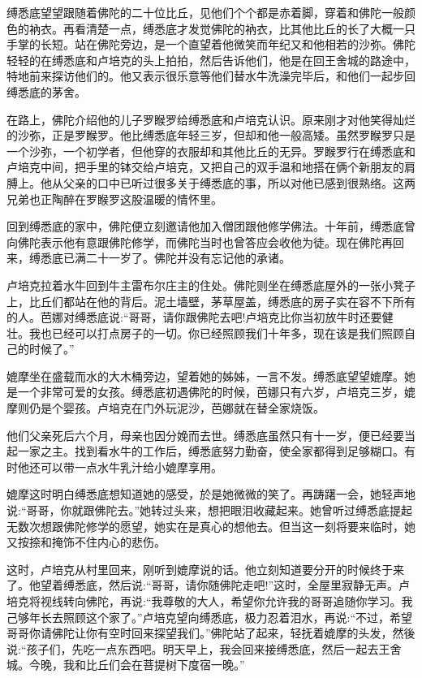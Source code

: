 \documentclass[12pt,twoside,openany]{book}
\begin{document}
缚悉底望望跟随着佛陀的二十位比丘，见他们个个都是赤着脚，穿着和佛陀一般颜色的衲衣。再看清楚一点，缚悉底才发觉佛陀的衲衣，比其他比丘的长了大概一只手掌的长短。站在佛陀旁边，是一个直望着他微笑而年纪又和他相若的沙弥。佛陀轻轻的在缚悉底和卢培克的头上拍拍，然后告诉他们，他是在回王舍城的路途中，特地前来探访他们的。他又表示很乐意等他们替水牛洗澡完毕后，和他们一起步回缚悉底的茅舍。

在路上，佛陀介绍他的儿子罗睺罗给缚悉底和卢培克认识。原来刚才对他笑得灿烂的沙弥，正是罗睺罗。他比缚悉底年轻三岁，但却和他一般高矮。虽然罗睺罗只是一个沙弥，一个初学者，但他穿的衣服却和其他比丘的无异。罗睺罗行在缚悉底和卢培克中间，把手里的钵交给卢培克，又把自己的双手温和地搭在俩个新朋友的肩膊上。他从父亲的口中已听过很多关于缚悉底的事，所以对他已感到很熟络。这两兄弟也正陶醉在罗睺罗这股温暖的情怀里。

回到缚悉底的家中，佛陀便立刻邀请他加入僧团跟他修学佛法。十年前，缚悉底曾向佛陀表示他有意跟佛陀修学，而佛陀当时也曾答应会收他为徒。现在佛陀再回来，缚悉底已满二十一岁了。佛陀并没有忘记他的承诸。

卢培克拉着水牛回到牛主雷布尔庄主的住处。佛陀则坐在缚悉底屋外的一张小凳子上，比丘们都站在他的背后。泥土墙壁，茅草屋盖，缚悉底的房子实在容不下所有的人。芭娜对缚悉底说:“哥哥，请你跟佛陀去吧!卢培克比你当初放牛时还要健壮。我也已经可以打点房子的一切。你已经照顾我们十年多，现在该是我们照顾自己的时候了。”

媲摩坐在盛载而水的大木桶旁边，望着她的姊姊，一言不发。缚悉底望望媲摩。她是一个非常可爱的女孩。缚悉底初遇佛陀的时候，芭娜只有六岁，卢培克三岁，媲摩则仍是个婴孩。卢培克在门外玩泥沙，芭娜就在替全家烧饭。

他们父亲死后六个月，母亲也因分娩而去世。缚悉底虽然只有十一岁，便已经要当起一家之主。找到看水牛的工作后，缚悉底努力勤奋，使全家都得到足够糊口。有时他还可以带一点水牛乳汁给小媲摩享用。

媲摩这时明白缚悉底想知道她的感受，於是她微微的笑了。再踌躇一会，她轻声地说:“哥哥，你就跟佛陀去。”她转过头来，想把眼泪收藏起来。她曾听过缚悉底提起无数次想跟佛陀修学的愿望，她实在是真心的想他去。但当这一刻将要来临时，她又按捺和掩饰不住内心的悲伤。

这时，卢培克从村里回来，刚听到媲摩说的话。他立刻知道要分开的时候终于来了。他望着缚悉底，然后说:“哥哥，请你随佛陀走吧!”这时，全屋里寂静无声。卢培克将视线转向佛陀，再说:“我尊敬的大人，希望你允许我的哥哥追随你学习。我己够年长去照顾这个家了。”卢培克望向缚悉底，极力忍着泪水，再说:“不过，希望哥哥你请佛陀让你有空时回来探望我们。”佛陀站了起来，轻抚着媲摩的头发，然後说:“孩子们，先吃一点东西吧。明天早上，我会回来接缚悉底，然后一起去王舍城。今晚，我和比丘们会在菩提树下度宿一晚。”
\end{document}
